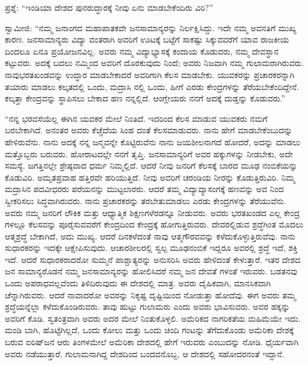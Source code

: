 ಪ್ರಶ್ನೆ: “ಇಂಡಿಯಾ ದೇಶದ ಪುನರುದ್ಧಾರಕ್ಕೆ ನೀವು ಏನು ಮಾಡಬೇಕೆಂದಿರು ವಿರಿ?”

ಸ್ವಾಮೀಜಿ: “ನಮ್ಮ ಜನಾಂಗದ ಮಹಾಪಾತಕವೇ ಜನಸಾಮಾನ್ಯರನ್ನು ನಿರ್ಲಕ್ಷಿಸಿದ್ದು. ಇದೇ ನಮ್ಮ ಅವನತಿಗೆ ಮುಖ್ಯ ಕಾರಣ. ಜನಸಾಮಾನ್ಯರು ವಿದ್ಯಾ ವಂತರಾಗಿ ಅವರಿಗೆ ಊಟಕ್ಕೆ ಬಟ್ಟೆಗೆ ಸಾಕಷ್ಟು ಸಿಕ್ಕುವವರೆಗೆ ಯಾವ ರಾಜಕೀಯ ದಿಂದಲೂ ಏನೂ ಪ್ರಯೋಜನವಿಲ್ಲ. ಅವರು ನಮ್ಮ ವಿದ್ಯಾಭ್ಯಾಸಕ್ಕೆ ಕಂದಾಯ ಕೊಡುವರು, ನಮ್ಮ ದೇವಸ್ಥಾನ ಕಟ್ಟುವರು. ಅದಕ್ಕೆ ಬದಲು ನಮ್ಮಿಂದ ಅವರಿಗೆ ದೊರಕುವುದು ನಿಂದೆ; ಅವರು ನಿಜವಾಗಿ ನಮ್ಮ ಗುಲಾಮರಾಗಿರುವರು. ನಾವುಭರತಖಂಡವನ್ನು ಉದ್ಧಾರ ಮಾಡಬೇಕಾದರೆ ಅವರಿಗಾಗಿ ಕೆಲಸ ಮಾಡಬೇಕು. ಯುವಕರನ್ನು ಪ್ರಚಾರಕರನ್ನಾಗಿ ತಯಾರು ಮಾಡಲು ಕಲ್ಕತದಲ್ಲಿ ಒಂದು, ಮದ್ರಾಸಿ ನಲ್ಲಿ ಒಂದು, ಹೀಗೆ ಎರಡು ಕೇಂದ್ರಗಳನ್ನು ತೆರೆಯಬೇಕೆಂದಿದ್ದೇನೆ. ಕಲ್ಕತ್ತಾ ಕೇಂದ್ರವನ್ನು ಸ್ಥಾಪಿಸಲು ಬೇಕಾದ ಹಣ ನನ್ನಲ್ಲಿದೆ. ಆಂಗ್ಲೇಯರು ನನಗೆ ಅದಕ್ಕೆ ದುಡ್ಡನ್ನು ಕೊಡುವರು.”

“ನನ್ನ ಭರವಸೆಯೆಲ್ಲ ಈಗಿನ ಯವಕರ ಮೇಲೆ ನಿಂತಿದೆ. ಇದರಿಂದ ಕೆಲಸ ಮಾಡುವ ಯುವಕರು ನಮಗೆ ಬರಬೇಕಾಗಿದೆ. ಅನಂತರ ಅವರು ಕೆಚ್ಚೆದೆಯ ಸಿಂಹ ದಂತೆ ಕೆಲಸಮಾಡುವರು. ನಾನು ಹೇಗೆ ಮಾಡಬೇಕೆಂಬುದನ್ನು ಹೇಳಿರುವೆನು. ನಾನು ಅದಕ್ಕೆ ನನ್ನ ಜನ್ಮವನ್ನೇ ಕೊಟ್ಟಿರುವೆನು ನಾನು ಜಯಶೀಲನಾಗದೆ ಹೋದರೆ, ಅದನ್ನು ಮಾಡಲು ಮತ್ತೊಬ್ಬರು ಬರುವರು. ಹೋರಾಟದಲ್ಲೇ ನನಗೆ ತೃಪ್ತಿ. ಜನಸಾಮಾನ್ಯರಿಗೆ ಅವರ ಹಕ್ಕುಗಳನ್ನು ನೀಡಬೇಕು, ಅದೇ ಸಮಸ್ಯೆ. ಜಗತ್ತಿನಲ್ಲೇ ಶ್ರೇಷ್ಠವಾದ ಧರ್ಮ ನಿಮ್ಮಲ್ಲಿದೆ. ಆದರೆ ನೀವು ಜನರಿಗೆ ಕೆಲಸಕ್ಕೆ ಬಾರದ ಮೂಢ ನಂಬಿಕೆಯನ್ನು ಕೊಡುವಿರಿ. ಅಮೃತಪ್ರವಾಹ ಹತ್ತಿರವೇ ಹರಿಯುತ್ತಿದೆ. ನೀವು ಅವರಿಗೆ ಚರಂಡಿಯ ನೀರನ್ನು ಕೊಡುತ್ತಿರುವಿರಿ. ನಿಮ್ಮ ಮದ್ರಾಸಿನ ಪದವೀಧರರು ಪರೆಯನನ್ನು ಮುಟ್ಟಲಾರರು. ಆದರೆ ತಮ್ಮ ವಿದ್ಯಾವ್ಯಾಸಂಗಕ್ಕೆ ಹಣವನ್ನು ಅವ ನಿಂದ ಸ್ವೀಕರಿಸಲು ಸಿದ್ಧವಾಗಿರುವರು. ನಾನು ಪ್ರಚಾರಕರನ್ನು ತರಬೇತುಮಾಡಲು ಎರಡು ಕೇಂದ್ರಗಳನ್ನು ತೆರೆಯುವೆನು. ಅವರು ನಮ್ಮ ಜನರಿಗೆ ಲೌಕಿಕ ಮತ್ತು ಆಧ್ಯಾತ್ಮಿಕ ಶಿಕ್ಷಣಗಳೆರಡನ್ನೂ ನೀಡುವರು. ಅವರು ಭರತಖಂಡದ ಎಲ್ಲ ಕೇಂದ್ರ ಗಳಲ್ಲೂ ಕೆಲಸವನ್ನು ಪೂರೈಸುವವರೆಗೆ ಕೇಂದ್ರದಿಂದ ಕೇಂದ್ರಕ್ಕೆ ಹೋಗುತ್ತಿರುವರು. ದೇವರಲ್ಲಿಡುವ ಶ್ರದ್ಧೆಗಿಂತ ಮೊದಲು ಆತ್ಮಶ್ರದ್ಧೆ ಬೇಕಾಗಿದೆ, ಅದು ಮುಖ್ಯ. ಆದರೆ ದಿನಕಳೆದಂತೆ ನಾವು ಆತ್ಮಗೌರವವನ್ನು ಕಳೆದುಕೊಳ್ಳುತ್ತಿರುವೆವು. ನಾನು ಸುಧಾರಕರನ್ನು ಇದಕ್ಕೇ ಆಕ್ಷೇಪಿಸುವುದು. ಆಚಾರಶೀಲರಲ್ಲಿ ಸ್ವಲ್ಪ ಮೂಢನಂಬಿಕೆ ಇದ್ದರೂ ಅವರಲ್ಲಿ ಶ್ರದ್ಧೆ ಇದೆ, ಶಕ್ತಿ ಇದೆ. ಆದರೆ ಸುಧಾರಕರಾದರೋ ಸುಮ್ಮನೆ ಪಾಶ್ಚಾತ್ಯರನ್ನು ಅನುಸರಿಸಿ ಅವರು ಹೇಳಿದಂತೆ ಕೇಳುತ್ತಾರೆ. ಇತರ ದೇಶದ ಜನ ಸಾಮಾನ್ಯರೊಡನೆ ನಮ್ಮ ಜನಸಾಮಾನ್ಯರನ್ನು ಹೋಲಿಸಿದರೆ ನಮ್ಮ ಜನ ದೇವತೆ ಗಳಂತೆ ಇರುವರು. ಬಡತನವು ಒಂದು ಅಪರಾಧವಲ್ಲವೆಂದು ತಿಳಿದಿರುವುದು ಈ ದೇಶದಲ್ಲಿ ಮಾತ್ರ. ಅವರು ದೈಹಿಕವಾಗಿ, ಮಾನಸಿಕವಾಗಿ ಚೆನ್ನಾಗಿರುವರು. ಆದರೆ ನಾವಾದರೋ ಅವರನ್ನು ನಿಕೃಷ್ಟ ದೃಷ್ಟಿಯಿಂದ ನೋಡುತ್ತಾ ಹೋದೆವು. ಈಗ ಅವರು ತಮ್ಮ ಶ್ರದ್ಧೆಯನ್ನೆಲ್ಲಾ ಕಳೆದುಕೊಂಡಿರುವರು. ತಾವು ಹುಟ್ಟು ಗುಲಾಮರು ಎಂದು ಅವರು ಭಾವಿಸುವರು. ಅವರ ಹಕ್ಕನ್ನು ಅವರಿಗೆ ಕೊಡಿ. ಸ್ವತಂತ್ರವಾಗಿ ಅವರು ಅದರ ಮೇಲೆ ನಿಂತುಕೊಳ್ಳಲಿ. ಅಮೆರಿಕದ ನಾಗರಿಕತೆಯ ಮಹಿಮೆಯೇ ಇದು. ಮಂಡಿ ಬಾಗಿ, ಹೊಟ್ಟೆಗಿಲ್ಲದೆ, ಒಂದು ಕೋಲು ಮತ್ತು ಒಂದು ಚಿಂದಿ ಗಂಟನ್ನು ತೆಗೆದುಕೊಂಡು ಅಮೆರಿಕಾ ದೇಶಕ್ಕೆ ಬರುವ ಐರಿಷ್​ ಜನ ಆರು ತಿಂಗಳಮೇಲೆ ಅಮೆರಿಕಾ ದೇಶದಲ್ಲಿ ಹೇಗೆ ಇರುವರು ಎಂಬುದನ್ನು ನೋಡಿ. ಧೈರ್ಯವಾಗಿ ಅವರು ನಡೆಯುತ್ತಾರೆ. ಗುಲಾಮನಾಗಿದ್ದ ದೇಶದಿಂದ ಬಂದವನೊಬ್ಬ, ಆ ದೇಶದಲ್ಲಿ ಸಹೋದರನಂತೆ ಇದ್ದಾನೆ.

